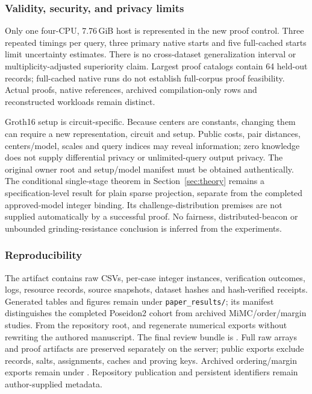 \subsubsection{Validity, security, and privacy limits}
Only one four-CPU, 7.76\,GiB host is represented in the new proof control. Three repeated timings per query, three primary native starts and five full-cached starts limit uncertainty estimates. There is no cross-dataset generalization interval or multiplicity-adjusted superiority claim. Largest proof catalogs contain 64 held-out records; full-cached native runs do not establish full-corpus proof feasibility. Actual proofs, native references, archived compilation-only rows and reconstructed workloads remain distinct.

Groth16 setup is circuit-specific. Because centers are constants, changing them can require a new representation, circuit and setup. Public costs, pair distances, centers/model, scales and query indices may reveal information; zero knowledge does not supply differential privacy or unlimited-query output privacy. The original owner root and setup/model manifest must be obtained authentically. The conditional single-stage theorem in Section~\ref{sec:theory} remains a specification-level result for plain sparse projection, separate from the completed approved-model integer binding. Its challenge-distribution premises are not supplied automatically by a successful proof. No fairness, distributed-beacon or unbounded grinding-resistance conclusion is inferred from the experiments.

\subsubsection{Reproducibility}
The artifact contains raw CSVs, per-case integer instances, verification outcomes, logs, resource records, source snapshots, dataset hashes and hash-verified receipts. Generated tables and figures remain under \texttt{paper\_results/}; its manifest distinguishes the completed Poseidon2 cohort from archived MiMC/order/margin studies. From the repository root,  and  regenerate numerical exports without rewriting the authored manuscript. The final review bundle is . Full raw arrays and proof artifacts are preserved separately on the server; public exports exclude records, salts, assignments, caches and proving keys. Archived ordering/margin exports remain under . Repository publication and persistent identifiers remain author-supplied metadata.
